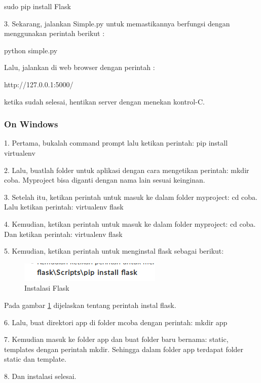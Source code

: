 \documentclass[12pt,a4paper]{article}
\begin{document}
	sudo pip install Flask

3. Sekarang, jalankan Simple.py untuk memastikannya berfungsi dengan menggunakan perintah berikut :

	python simple.py

Lalu, jalankan di web browser dengan perintah :

http://127.0.0.1:5000/

ketika sudah selesai, hentikan server dengan menekan kontrol-C.
\subsubsection{On Windows}

1.	Pertama, bukalah command prompt lalu ketikan perintah: pip install virtualenv

2.	Lalu, buatlah folder untuk aplikasi dengan cara mengetikan perintah: mkdir coba.
Myproject bisa diganti dengan nama lain sesuai keinginan.

3.	Setelah itu, ketikan perintah untuk masuk ke dalam folder myproject: cd coba. Lalu ketikan perintah: virtualenv flask

4.	Kemudian, ketikan perintah untuk masuk ke dalam folder myproject: cd coba. Dan ketikan perintah: virtualenv flask

5.	Kemudian, ketikan perintah untuk menginstal flask sebagai berikut:
\begin{figure}[ht]
\centerline{\includegraphics[scale=1]{../figures/3instal.png} }

\caption{Instalasi Flask} 
\label{Flask}
\end{figure}

Pada gambar \ref{Flask} dijelaskan tentang perintah instal flask.

6.	Lalu, buat direktori app di folder mcoba dengan perintah: mkdir app

7.	Kemudian masuk ke folder app dan buat folder baru bernama: static, templates dengan perintah mkdir. Sehingga dalam folder app terdapat folder static dan template.

8.	Dan instalasi selesai.
\end{document}
